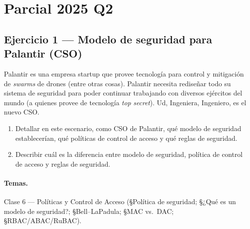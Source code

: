 \section{Parcial 2025 Q2}

\subsection{Ejercicio 1 --- Modelo de seguridad para Palantir (CSO)}

\begin{consigna}
Palantir es una empresa startup que provee tecnología para control y mitigación de
\emph{swarms} de drones (entre otras cosas). Palantir necesita rediseñar todo su sistema
de seguridad para poder continuar trabajando con diversos ejércitos del mundo (a quienes
provee de tecnología \emph{top secret}). Ud, Ingeniera, Ingeniero, es el nuevo CSO.
\begin{enumerate}
  \item[a)] Detallar en este escenario, como CSO de Palantir, qué modelo de seguridad
  establecerían, qué políticas de control de acceso y qué reglas de seguridad.
  \item[b)] Describir cuál es la diferencia entre modelo de seguridad, política de control
  de acceso y reglas de seguridad.
\end{enumerate}
\end{consigna}

\paragraph{Temas.}
Clase 6 --- Políticas y Control de Acceso (\S Política de seguridad; \S ¿Qué es un modelo
de seguridad?; \S Bell--LaPadula; \S MAC vs.\ DAC; \S RBAC/ABAC/RuBAC).

